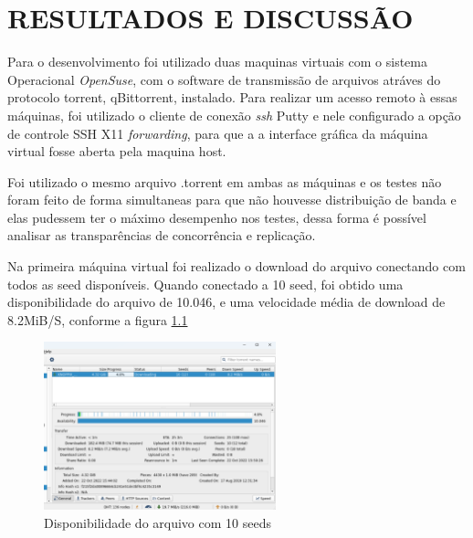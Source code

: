 \chapter{RESULTADOS E DISCUSSÃO}
\label{cap:04}
Para o desenvolvimento foi utilizado duas maquinas virtuais com o sistema Operacional \textit {OpenSuse}, com o software de transmissão de arquivos atráves do protocolo torrent, qBittorrent, instalado.
Para realizar um acesso remoto à essas máquinas, foi utilizado o cliente de conexão  \textit{\ac{ssh}} Putty e nele configurado a opção de controle SSH X11 \textit {forwarding}, para que a a interface gráfica da máquina virtual fosse aberta pela maquina host.

Foi utilizado o mesmo arquivo .torrent em ambas as máquinas e os testes não foram feito de forma simultaneas para que não houvesse distribuição de banda e elas pudessem ter o máximo desempenho nos testes, dessa forma é possível analisar as transparências de concorrência e replicação. 

Na primeira máquina virtual foi realizado o download do arquivo conectando com todos as \ac{seed} disponíveis. Quando conectado a 10 \ac{seed}, foi obtido uma disponibilidade do arquivo de 10.046, e uma velocidade média de download de 8.2MiB/S, conforme a figura \ref{fig:disponibilidade 10 seeds}  
\begin{figure}[!htb]
\centering
\includegraphics[width=0.6\textwidth]{./images/disponibilidade 10 seeds.png}
\caption{Disponibilidade do arquivo com 10 seeds}
\label{fig:disponibilidade 10 seeds}
\end{figure}

